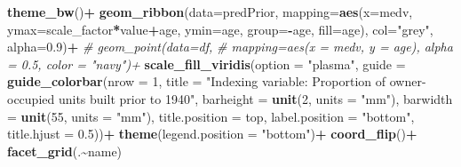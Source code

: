 \documentclass[
]{article}
\newenvironment{Shaded}{\begin{snugshade}}{\end{snugshade}}
\newcommand{\AttributeTok}[1]{\textcolor[rgb]{0.13,0.29,0.53}{#1}}
\newcommand{\CommentTok}[1]{\textcolor[rgb]{0.56,0.35,0.01}{\textit{#1}}}
\newcommand{\DecValTok}[1]{\textcolor[rgb]{0.00,0.00,0.81}{#1}}
\newcommand{\FloatTok}[1]{\textcolor[rgb]{0.00,0.00,0.81}{#1}}
\newcommand{\FunctionTok}[1]{\textcolor[rgb]{0.13,0.29,0.53}{\textbf{#1}}}
\newcommand{\NormalTok}[1]{#1}
\newcommand{\SpecialCharTok}[1]{\textcolor[rgb]{0.81,0.36,0.00}{\textbf{#1}}}
\newcommand{\StringTok}[1]{\textcolor[rgb]{0.31,0.60,0.02}{#1}}
\begin{document}
\begin{Shaded}
\begin{Highlighting}[]
  \FunctionTok{theme\_bw}\NormalTok{()}\SpecialCharTok{+}
  \FunctionTok{geom\_ribbon}\NormalTok{(}\AttributeTok{data=}\NormalTok{predPrior,}
              \AttributeTok{mapping=}\FunctionTok{aes}\NormalTok{(}\AttributeTok{x=}\NormalTok{medv, }\AttributeTok{ymax=}\NormalTok{scale\_factor}\SpecialCharTok{*}\NormalTok{value}\SpecialCharTok{+}\NormalTok{age, }
                          \AttributeTok{ymin=}\NormalTok{age, }\AttributeTok{group=}\SpecialCharTok{{-}}\NormalTok{age, }\AttributeTok{fill=}\NormalTok{age),}
              \AttributeTok{col=}\StringTok{"grey"}\NormalTok{, }\AttributeTok{alpha=}\FloatTok{0.9}\NormalTok{)}\SpecialCharTok{+}
  \CommentTok{\# geom\_point(data=df,}
  \CommentTok{\#            mapping=aes(x = medv, y = age), alpha = 0.5, color = "navy")+}
  \FunctionTok{scale\_fill\_viridis}\NormalTok{(}\AttributeTok{option =} \StringTok{"plasma"}\NormalTok{,}
                     \AttributeTok{guide =} \FunctionTok{guide\_colorbar}\NormalTok{(}\AttributeTok{nrow =} \DecValTok{1}\NormalTok{,}
                                            \AttributeTok{title =} \StringTok{"Indexing variable: Proportion of owner{-}occupied units built prior to 1940"}\NormalTok{,}
                                            \AttributeTok{barheight =} \FunctionTok{unit}\NormalTok{(}\DecValTok{2}\NormalTok{, }\AttributeTok{units =} \StringTok{"mm"}\NormalTok{),}
                                            \AttributeTok{barwidth =} \FunctionTok{unit}\NormalTok{(}\DecValTok{55}\NormalTok{, }\AttributeTok{units =} \StringTok{"mm"}\NormalTok{),}
                                            \AttributeTok{title.position =} \StringTok{\textquotesingle{}top\textquotesingle{}}\NormalTok{,}
                                            \AttributeTok{label.position =} \StringTok{"bottom"}\NormalTok{,}
                                            \AttributeTok{title.hjust =} \FloatTok{0.5}\NormalTok{))}\SpecialCharTok{+}
  \FunctionTok{theme}\NormalTok{(}\AttributeTok{legend.position =} \StringTok{"bottom"}\NormalTok{)}\SpecialCharTok{+}
  \FunctionTok{coord\_flip}\NormalTok{()}\SpecialCharTok{+}
  \FunctionTok{facet\_grid}\NormalTok{(.}\SpecialCharTok{\textasciitilde{}}\NormalTok{name)}
\end{Highlighting}
\end{Shaded}
\end{document}

